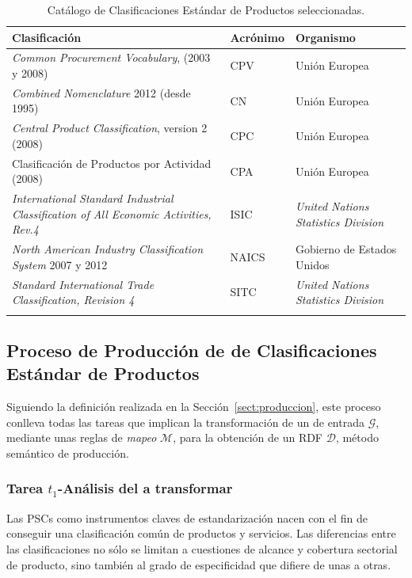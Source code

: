 \begin{longtable}[c]{|p{6cm}|l|p{6cm}|} 
\hline
  \textbf{Clasificación} &  \textbf{Acrónimo} & \textbf{Organismo} \\\hline
\endhead
\textit{Common Procurement Vocabulary}, (2003 y 2008) & \gls{CPV} & Unión Europea \\ \hline
\textit{Combined Nomenclature} 2012 (desde 1995) & \gls{CN} & Unión Europea  \\ \hline
\textit{Central Product Classification}, version 2 (2008) & \gls{CPC} & Unión Europea \\ \hline
Clasificación de Productos por Actividad (2008) & \gls{CPA} & Unión Europea \\ \hline
\textit{International Standard Industrial Classification of All Economic Activities, Rev.4} & \gls{ISIC} & \textit{United Nations Statistics Division} \\ \hline
\textit{North American Industry Classification System} 2007 y 2012 & \gls{NAICS} & Gobierno de Estados Unidos \\ \hline
\textit{Standard International Trade Classification, Revision 4} & \gls{SITC} & \textit{United Nations Statistics Division} \\ \hline
\hline
\caption{Catálogo de Clasificaciones Estándar de Productos seleccionadas.}\label{table:pscs-ld}\\    
\end{longtable}

\subsection{Proceso de Producción de \linkeddata de Clasificaciones\\ Estándar de Productos}
Siguiendo la definición realizada en la Sección~\ref{sect:produccion}, este proceso conlleva
todas las tareas que implican la transformación de un \dataset de entrada $\mathcal{G}$, mediante
unas reglas de \textit{mapeo} $\mathcal{M}$, para la obtención de un \dataset \gls{RDF} $\mathcal{D}$, método semántico 
de producción. 

\subsubsection{Tarea $t_1$-Análisis del \dataset a transformar}\label{t1-pscs}
Las \gls{PSC}s como instrumentos claves de estandarización nacen con el fin de
conseguir una clasificación común de productos y servicios. Las diferencias entre las clasificaciones no
sólo se limitan a cuestiones de alcance y cobertura sectorial de producto, sino también al grado de especificidad que difiere de unas a otras.

